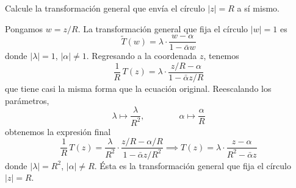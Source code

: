 \begin{exercise}
Calcule la transformación general que envía el círculo $|z| = R$ a sí mismo.
\end{exercise}

\begin{solution}
Pongamos $w = z/R$. La transformación general que fija el círculo $|w| = 1$ es
$$\tilde T(w) = \lambda \cdot \frac {w - \alpha} {1 - \bar \alpha w}$$
donde $|\lambda| = 1$, $|\alpha| \ne 1$. Regresando a la coordenada $z$, tenemos
$$\frac 1R \, T(z) = \lambda \cdot \frac {z/R - \alpha} {1 - \bar \alpha z/R}$$
que tiene casi la misma forma que la ecuación original. Reescalando los parámetros,
$$\lambda \mapsto \frac \lambda {R^2}, \qquad \qquad \alpha \mapsto \frac \alpha R$$
obtenemos la expresión final
$$
\frac 1R \, T(z) = \frac \lambda {R^2} \cdot \frac {z/R - \alpha / R} {1 - \bar \alpha z / R^2}
\implies
T(z) = \lambda \cdot \frac {z - \alpha} {R^2 - \bar \alpha z}$$
donde $|\lambda| = R^2$, $|\alpha| \ne R$. Ésta es la transformación general que fija el círculo $|z| = R$.
\end{solution}

